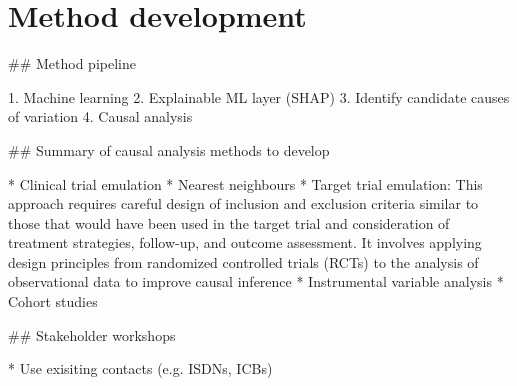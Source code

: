 \section{Method development}

\begin{markdown}
## Method pipeline

1. Machine learning
2. Explainable ML layer (SHAP)
3. Identify candidate causes of variation
4. Causal analysis

## Summary of causal analysis methods to develop

* Clinical trial emulation
  * Nearest neighbours 
  * Target trial emulation: This approach requires careful design of inclusion and exclusion criteria similar to those that would have been used in the target trial and consideration of treatment strategies, follow-up, and outcome assessment. It involves applying design principles from randomized controlled trials (RCTs) to the analysis of observational data to improve causal inference
* Instrumental variable analysis
* Cohort studies

## Stakeholder workshops

* Use exisiting contacts (e.g. ISDNs, ICBs) 
\end{markdown}